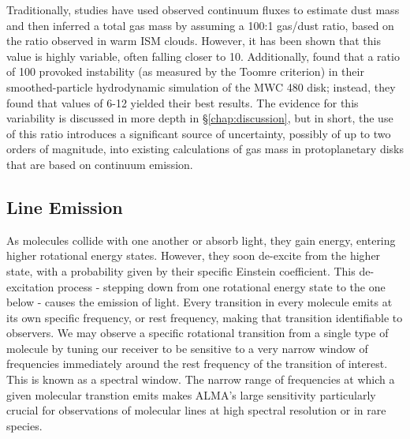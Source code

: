 
Traditionally, studies have used observed continuum fluxes to estimate dust mass and then inferred a total gas mass by assuming a 100:1 gas/dust ratio, based on the ratio observed in warm ISM clouds. However, it has been shown \citep[e.g][]{Miotello2016,Miotello2017} that this value is highly variable, often falling closer to 10. Additionally, \citet{Liu2018} found that a ratio of 100 provoked instability (as measured by the Toomre criterion) in their smoothed-particle hydrodynamic simulation of the MWC 480 disk; instead, they found that values of 6-12 yielded their best results. The evidence for this variability is discussed in more depth in \S\ref{chap:discussion}, but in short, the use of this ratio introduces a significant source of uncertainty, possibly of up to two orders of magnitude, into existing calculations of gas mass in protoplanetary disks that are based on continuum emission.









\subsection{Line Emission}

As molecules collide with one another or absorb light, they gain energy, entering higher rotational energy states. However, they soon de-excite from the higher state, with a probability given by their specific Einstein coefficient. This de-excitation process - stepping down from one rotational energy state to the one below - causes the emission of light. Every transition in every molecule emits at its own specific frequency, or rest frequency, making that transition identifiable to observers. We may observe a specific rotational transition from a single type of molecule by tuning our receiver to be sensitive to a very narrow window of frequencies immediately around the rest frequency of the transition of interest. This is known as a spectral window. The narrow range of frequencies at which a given molecular transtion emits makes ALMA's large sensitivity particularly crucial for observations of molecular lines at high spectral resolution or in rare species.

